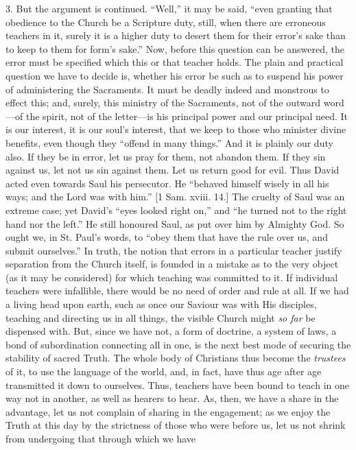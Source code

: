 3. But the argument is continued. ``Well,'' it may be said,
``even granting that obedience to the Church be a Scripture duty,
still, when there are erroneous teachers in it, surely it is a higher
duty to desert them for their error's sake than to keep to them for
form's sake.'' Now, before this question can be answered, the
error must be specified which this or that teacher holds. The plain
and practical question we have to decide is, whether his error be such
as to suspend his power of administering the Sacraments. It must be
deadly indeed and monstrous to effect this; and, surely, this ministry
of the Sacraments, not of the outward word—of the spirit, not of the
letter—is his principal power and our principal need. It is our
interest, it is our soul's interest, that we keep to those who
minister divine benefits, even though they ``offend in many
things.'' And it is plainly our duty also. If they be in error,
let us pray for them, not abandon them. If they sin against us, let
not us sin against them. Let us return good for evil. Thus David acted
even towards Saul his persecutor. He ``behaved himself wisely in
all his ways; and the Lord was with him.'' [1 Sam. xviii. 14.] The
cruelty of Saul was an extreme case; yet David's ``eyes looked
right on,'' and ``he turned not to the right hand nor the
left.'' He still honoured Saul, as put over him by Almighty God.
So ought we, in St. Paul's words, to ``obey them that have the
rule over us, and submit ourselves.'' In truth, the notion that
errors in a particular teacher justify separation from the Church
itself, is founded in a mistake as to the very object (as it may be
considered) for which teaching was committed to it. If individual
teachers were infallible, there would be no need of order and rule at
all. If we had a living head upon earth, such as once our Saviour was
with His disciples, teaching and directing us in all things, the
visible Church might \emph{so far} be dispensed with. But, since we
have not, a form of doctrine, a system of laws, a bond of
subordination connecting all in one, is the next best mode of securing
the stability of sacred Truth. The whole body of Christians thus
become the \emph{trustees} of it, to use the language of the world,
and, in fact, have thus age after age transmitted it down to
ourselves. Thus, teachers have been bound to teach in one way not in
another, as well as hearers to hear. As, then, we have a share in the
advantage, let us not complain of sharing in the engagement; as we
enjoy the Truth at this day by the strictness of those who were before
us, let us not shrink from undergoing that through which we have
